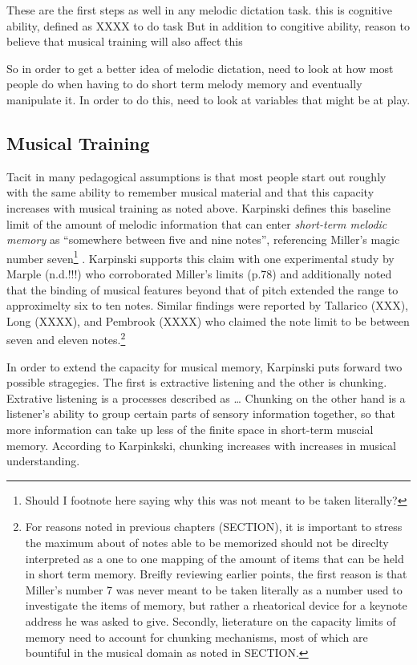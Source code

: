 \documentclass[]{book}
\let\rmarkdownfootnote\footnote%
\def\footnote{\protect\rmarkdownfootnote}
\begin{document}
These are the first steps as well in any melodic dictation task.
this is cognitive ability, defined as XXXX to do task
But in addition to congitive ability, reason to believe that musical training will also affect this

So in order to get a better idea of melodic dictation, need to look at how most people do when having to do short term melody memory and eventually manipulate it.
In order to do this, need to look at variables that might be at play.

\hypertarget{musical-training-1}{%
\subsection{Musical Training}\label{musical-training-1}}

Tacit in many pedagogical assumptions is that most people start out roughly with the same ability to remember musical material and that this capacity increases with musical training as noted above.
Karpinski defines this baseline limit of the amount of melodic information that can enter \emph{short-term melodic memory} as ``somewhere between five and nine notes'', referencing Miller's magic number seven\footnote{Should I footnote here saying why this was not meant to be taken literally?} \citep{millerMagicalNumberSeven1956}.
Karpinski supports this claim with one experimental study by Marple (n.d.!!!) who corroborated Miller's limits (p.78) and additionally noted that the binding of musical features beyond that of pitch extended the range to approximelty six to ten notes.
Similar findings were reported by Tallarico (XXX), Long (XXXX), and Pembrook (XXXX) who claimed the note limit to be between seven and eleven notes.\footnote{For reasons noted in previous chapters (SECTION), it is important to stress the maximum about of notes able to be memorized should not be direclty interpreted as a one to one mapping of the amount of items that can be held in short term memory.
  Breifly reviewing earlier points, the first reason is that Miller's number 7 was never meant to be taken literally as a number used to investigate the items of memory, but rather a rheatorical device for a keynote address he was asked to give.
  Secondly, lieterature on the capacity limits of memory need to account for chunking mechanisms, most of which are bountiful in the musical domain as noted in SECTION.}

In order to extend the capacity for musical memory, Karpinski puts forward two possible stragegies.
The first is extractive listening and the other is chunking.
Extrative listening is a processes described as \ldots{}
Chunking on the other hand is a listener's ability to group certain parts of sensory information together, so that more information can take up less of the finite space in short-term muscial memory.
According to Karpinkski, chunking increases with increases in musical understanding.
\end{document}
